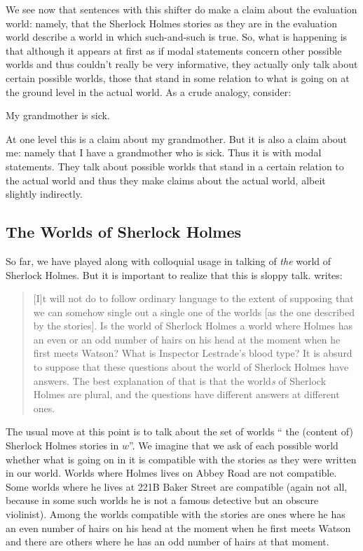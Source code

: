 We see now that sentences with this shifter do make a claim about the evaluation
world: namely, that the Sherlock Holmes stories as they are in the evaluation
world describe a world in which such-and-such is true. So, what is happening is
that although it appears at first as if modal statements concern other possible
worlds and thus couldn't really be very informative, they actually only talk
about certain possible worlds, those that stand in some relation to what is
going on at the ground level in the actual world. As a crude analogy, consider:

\ex My grandmother is sick. \xe

At one level this is a claim about my grandmother. But it is also a claim about
me: namely that I have a grandmother who is sick. Thus it is with modal
statements. They talk about possible worlds that stand in a certain relation to
the actual world and thus they make claims about the actual world, albeit
slightly indirectly.

\subsection{The Worlds of Sherlock Holmes} \label{sec:worlds-sherl-holm}

So far, we have played along with colloquial usage in talking of \emph{the}
world of Sherlock Holmes. But it is important to realize that this is sloppy
talk. \citet{lewis:1978:fiction} writes:

\begin{quote}
  [I]t will not do to follow ordinary language to the extent of supposing that
  we can somehow single out a single one of the worlds [as the one described by
  the stories]. Is the world of Sherlock Holmes a world where Holmes has an even
  or an odd number of hairs on his head at the moment when he first meets
  Watson? What is Inspector Lestrade's blood type? It is absurd to suppose that
  these questions about the world of Sherlock Holmes have answers. The best
  explanation of that is that the world\emph{s} of Sherlock Holmes are plural,
  and the questions have different answers at different ones.
\end{quote}
%
The usual move at this point is to talk about the set of worlds
`` the (content of) Sherlock Holmes stories in $w$''. We
imagine that we ask of each possible world whether what is going on in it is
compatible with the stories as they were written in our world. Worlds where
Holmes lives on Abbey Road are not compatible. Some worlds where he lives at
221B Baker Street are compatible (again not all, because in some such worlds he
is not a famous detective but an obscure violinist). Among the worlds compatible
with the stories are ones where he has an even number of hairs on his head at
the moment when he first meets Watson and there are others where he has an odd
number of hairs at that moment.

